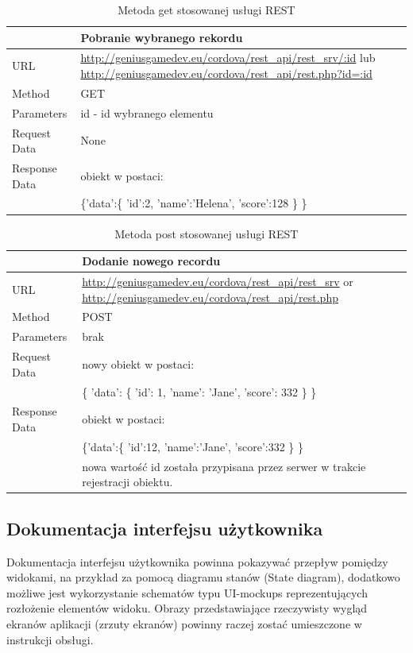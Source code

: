 \documentclass[12pt,a4paper]{article}
\begin{document}
\begin{table}
\begin{tabularx}{\textwidth}{|l|X|}
\hline
&\textbf{Pobranie wybranego rekordu}\\\hline
URL &   \url{http://geniusgamedev.eu/cordova/rest_api/rest_srv/:id} lub \url{http://geniusgamedev.eu/cordova/rest_api/rest.php?id=:id}\\\hline
Method  & GET\\\hline
Parameters  & id - id wybranego elementu \\\hline
Request Data & None\\\hline
Response Data & obiekt w postaci:\\
&

\{'data':\{
    'id':2,
    'name':'Helena',
    'score':128
    \}
\}

\\\hline
\end{tabularx}
\caption{Metoda get stosowanej usługi REST}\label{rest1}
\end{table}

\begin{table}
\begin{tabularx}{\textwidth}{|l|X|}
\hline
&\textbf{Dodanie nowego recordu}\\\hline
URL &   \url{http://geniusgamedev.eu/cordova/rest_api/rest_srv} or \url{http://geniusgamedev.eu/cordova/rest_api/rest.php}\\\hline
Method  & POST\\\hline
Parameters  & brak \\\hline
Request Data & nowy obiekt w postaci:\\
&\{
'data': \{
'id': 1,
'name': 'Jane',
'score': 332
\}
\}
\\\hline
Response Data & obiekt w postaci:\\
&
\{'data':\{
    'id':12,
    'name':'Jane',
    'score':332
    \}
\}
\\
&nowa wartość id została przypisana przez serwer w trakcie rejestracji obiektu.
\\\hline
\end{tabularx}
\caption{Metoda post stosowanej usługi REST}\label{rest2}
\end{table}



\subsection{Dokumentacja interfejsu użytkownika}
Dokumentacja interfejsu użytkownika powinna pokazywać przepływ pomiędzy widokami, na przykład za pomocą diagramu stanów (State diagram), dodatkowo możliwe jest wykorzystanie schematów typu UI-mockups reprezentujących rozłożenie elementów widoku. Obrazy przedstawiające rzeczywisty wygląd ekranów aplikacji (zrzuty ekranów) powinny raczej zostać umieszczone w instrukcji obsługi.
\end{document}
